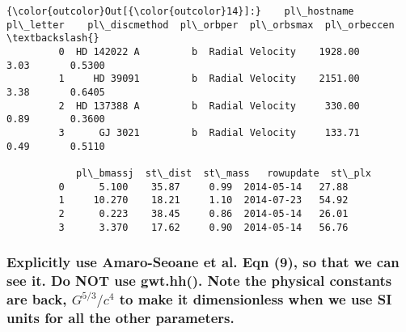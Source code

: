 \documentclass[11pt]{article}
\begin{document}
\begin{Verbatim}[commandchars=\\\{\}]
{\color{outcolor}Out[{\color{outcolor}14}]:}    pl\_hostname pl\_letter    pl\_discmethod  pl\_orbper  pl\_orbsmax  pl\_orbeccen  \textbackslash{}
         0  HD 142022 A         b  Radial Velocity    1928.00        3.03       0.5300   
         1     HD 39091         b  Radial Velocity    2151.00        3.38       0.6405   
         2  HD 137388 A         b  Radial Velocity     330.00        0.89       0.3600   
         3      GJ 3021         b  Radial Velocity     133.71        0.49       0.5110   
         
            pl\_bmassj  st\_dist  st\_mass   rowupdate  st\_plx  
         0      5.100    35.87     0.99  2014-05-14   27.88  
         1     10.270    18.21     1.10  2014-07-23   54.92  
         2      0.223    38.45     0.86  2014-05-14   26.01  
         3      3.370    17.62     0.90  2014-05-14   56.76  
\end{Verbatim}
            
    \subsubsection{\texorpdfstring{Explicitly use Amaro-Seoane et al. Eqn
(9), so that we can see it. Do NOT use gwt.hh(). Note the physical
constants are back, \(G^{5/3}/c^{4}\) to make it dimensionless when we
use SI units for all the other
parameters.}{Explicitly use Amaro-Seoane et al. Eqn (9), so that we can see it. Do NOT use gwt.hh(). Note the physical constants are back, G\^{}\{5/3\}/c\^{}\{4\} to make it dimensionless when we use SI units for all the other parameters.}}\label{explicitly-use-amaro-seoane-et-al.-eqn-9-so-that-we-can-see-it.-do-not-use-gwt.hh.-note-the-physical-constants-are-back-g53c4-to-make-it-dimensionless-when-we-use-si-units-for-all-the-other-parameters.}
\end{document}
